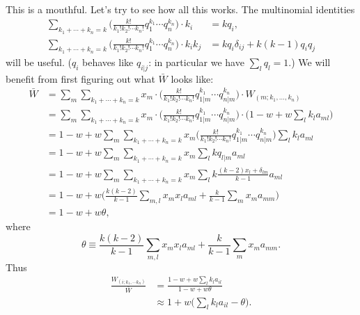 \documentclass[14pt, justified]{tufte-handout}
\begin{document}
This is a mouthful.
Let's try to see how all this works.
The multinomial identities
\begin{equation}
    \begin{split}
        \sum_{k_1 + \cdots + k_n = k}\Big( \frac{k!}{k_1! k_2! \cdots k_n!} q_1^{k_1} \cdots q_n^{k_n} \Big) \cdot k_i &= kq_i,
        \\
        \sum_{k_1 + \cdots + k_n = k}\Big( \frac{k!}{k_1! k_2! \cdots k_n!} q_1^{k_1} \cdots q_n^{k_n} \Big) \cdot k_i k_j &= kq_i\delta_{ij} + k(k-1)q_i q_j
    \end{split}
\end{equation}
will be useful.
($q_i$ behaves like $q_{i|j}$: in particular we have $\sum_l q_l = 1$.)
We will benefit from first figuring out what $\bar{W}$ looks like:
\begin{equation}
    \begin{split}
        \bar{W} &= \sum_m \sum_{k_1 + \cdots + k_n = k} x_m \cdot \Big( \frac{k!}{k_1! k_2! \cdots k_n!} q_{1|m}^{k_1} \cdots q_{n|m}^{k_n} \Big) \cdot W_{(m; k_1, \ldots ,k_n)}
        \\
        &= \sum_m \sum_{k_1 + \cdots + k_n = k} x_m \cdot \Big( \frac{k!}{k_1! k_2! \cdots k_n!} q_{1|m}^{k_1} \cdots q_{n|m}^{k_n} \Big) \cdot \Big( 1 - w + w\sum_l k_l a_{ml} \Big)
        \\
        &= 1 - w + w\sum_m \sum_{k_1 + \cdots + k_n = k} x_m \Big( \frac{k!}{k_1! k_2! \cdots k_n!} q_{1|m}^{k_1} \cdots q_{n|m}^{k_n} \Big) \sum_l k_l a_{ml}
        \\
        &= 1 - w + w\sum_m \sum_{k_1 + \cdots + k_n = k} x_m \sum_l k q_{l|m} a_{ml}
        \\
        &= 1 - w + w\sum_m \sum_{k_1 + \cdots + k_n = k} x_m \sum_l k \frac{(k-2)x_l + \delta_{lm}}{k-1} a_{ml}
        \\
        &= 1 - w + w \Big(\frac{k(k-2)}{k-1} \sum_{m,l} x_m x_l a_{ml} + \frac{k}{k-1} \sum_m x_m a_{mm} \Big)
        \\
        &= 1 - w + w\theta,
    \end{split}
\end{equation}
where
\begin{equation}
    \theta \equiv \frac{k(k-2)}{k-1} \sum_{m,l} x_m x_l a_{ml} + \frac{k}{k-1} \sum_m x_m a_{mm}.
\end{equation}
Thus
\begin{equation}
    \begin{split}
        \frac{W_{(i; k_1, \cdots k_n)}}{\bar{W}} & = \frac{1 - w + w\sum_l k_l a_{il}}{1 - w + w\theta}
        \\
        & \approx 1 + w \Big( \sum_l k_l a_{il} - \theta \Big).
    \end{split}
\end{equation}
\end{document}
